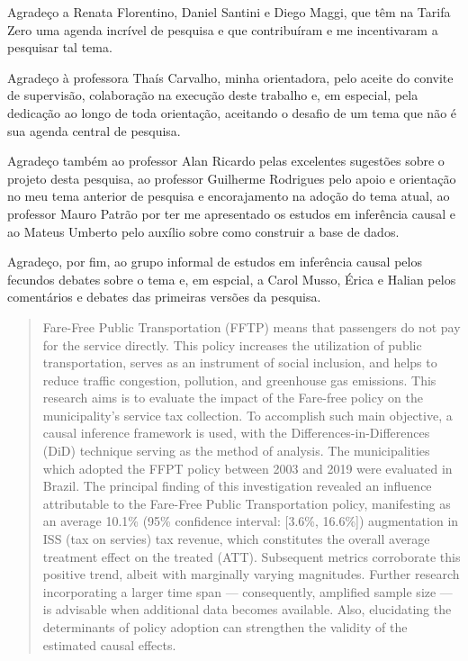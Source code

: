 \documentclass[12pt, a4paper, twoside]{article}
\numberwithin{equation}{subsection} %
\begin{document}
Agradeço a Renata Florentino, Daniel Santini e Diego Maggi, que têm na Tarifa Zero uma agenda incrível de pesquisa e que contribuíram e me incentivaram a pesquisar tal tema.

Agradeço à professora Thaís Carvalho, minha orientadora, pelo aceite do convite de supervisão, colaboração na execução deste trabalho e, em especial, pela dedicação ao longo de toda orientação, aceitando o desafio de um tema que não é sua agenda central de pesquisa.

Agradeço também ao professor Alan Ricardo pelas excelentes sugestões sobre o projeto desta pesquisa, ao professor Guilherme Rodrigues pelo apoio e orientação no meu tema anterior de pesquisa e encorajamento na adoção do tema atual, ao professor Mauro Patrão por ter me apresentado os estudos em inferência causal e ao Mateus Umberto pelo auxílio sobre como construir a base de dados.

Agradeço, por fim, ao grupo informal de estudos em inferência causal pelos fecundos debates sobre o tema e, em espcial, a Carol Musso, Érica e Halian pelos comentários e debates das primeiras versões da pesquisa.


\newpage



\begin{abstract}
Fare-Free Public Transportation (FFTP) means that passengers do not pay for the service directly.
This policy increases the utilization of public transportation, serves as an instrument of social inclusion, and helps to reduce traffic congestion, pollution, and greenhouse gas emissions.
This research aims is to evaluate the impact of the Fare-free policy on the municipality's service tax collection.
To accomplish such main objective, a causal inference framework is used, with the Differences-in-Differences (DiD) technique serving as the method of analysis.
The municipalities which adopted the FFPT policy between 2003 and 2019 were evaluated in Brazil.
The principal finding of this investigation revealed an influence attributable to the Fare-Free Public Transportation policy, manifesting as an average 10.1\% (95\% confidence interval: [3.6\%, 16.6\%]) augmentation in ISS (tax on servies) tax revenue, which constitutes the overall average treatment effect on the treated (ATT). 
Subsequent metrics corroborate this positive trend, albeit with marginally varying magnitudes.
Further research incorporating a larger time span --- consequently, amplified sample size --- is advisable when additional data becomes available. Also, elucidating the determinants of policy adoption can strengthen the validity of the estimated causal effects.
\end{abstract}
\end{document}
